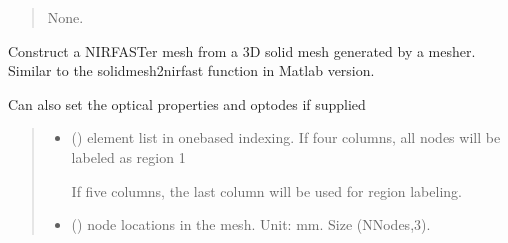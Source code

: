 \documentclass[letterpaper,10pt,english]{sphinxmanual}
\begin{document}
\begin{fulllineitems}
\begin{fulllineitems}
\begin{quote}
\begin{description}
\begin{itemize}
\end{itemize}

\sphinxAtStartPar
None.

\end{description}\end{quote}

\end{fulllineitems}


\begin{fulllineitems}
\label{\detokenize{_autosummary/nirfasterff.base.fluor_mesh.fluormesh:nirfasterff.base.fluor_mesh.fluormesh.from_solid}}
\pysigstartsignatures
{}
\pysigstopsignatures
\sphinxAtStartPar
Construct a NIRFASTer mesh from a 3D solid mesh generated by a mesher. Similar to the solidmesh2nirfast function in Matlab version.

\sphinxAtStartPar
Can also set the optical properties and optodes if supplied
\begin{quote}\begin{description}
\begin{itemize}
\item {} 
\sphinxAtStartPar
{} () \textendash{} 
\sphinxAtStartPar
element list in one\sphinxhyphen{}based indexing. If four columns, all nodes will be labeled as region 1

\sphinxAtStartPar
If five columns, the last column will be used for region labeling.


\item {} 
\sphinxAtStartPar
{} () \textendash{} node locations in the mesh. Unit: mm. Size (NNodes,3).


\end{itemize}
\end{description}
\end{quote}
\end{fulllineitems}
\end{fulllineitems}
\end{document}
